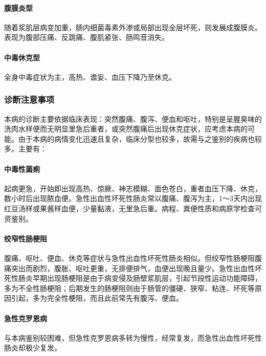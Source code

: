 \paragraph{腹膜炎型}

随着浆肌层病变加重，肠内细菌毒素外渗或局部出现全层坏死，则发展成腹膜炎。表现为腹部压痛、反跳痛、腹肌紧张、肠鸣音消失。

\paragraph{中毒休克型}

全身中毒症状为主，高热、谵妄、血压下降乃至休克。

\subsubsection{诊断注意事项}

本病的诊断主要依据临床表现：突然腹痛、腹泻、便血和呕吐，特别是呈腥臭味的洗肉水样便而无明显里急后重者，或突然腹痛后出现休克症状，应考虑本病的可能。由于本病的病情变化迅速且复杂，临床分型也较多，故需与之鉴别的疾病也较多。主要有：

\paragraph{中毒性菌痢}

起病更急，开始即出现高热、惊厥、神志模糊、面色苍白，重者血压下降、休克，数小时后出现脓血便。急性出血性坏死性肠炎常以腹痛、腹泻为主，1～3天内出现红豆汤样或果酱样血便，少量黏液，无里急后重。病程、粪便性质和病原学检查可资鉴别。

\paragraph{绞窄性肠梗阻}

腹痛、呕吐、便血、休克等症状与急性出血性坏死性肠炎相似。但绞窄性肠梗阻腹痛突出而剧烈，腹胀、呕吐更重，无排便排气，血便出现晚且量少。急性出血性坏死性肠炎早期出现肠梗阻是由于病变侵及肠壁浆肌层，引起节段性运动功能障碍，多为不全性肠梗阻；后期发生的肠梗阻则由于肠管的僵硬、狭窄、粘连、坏死等原因引起，多为完全性梗阻，而且此前常先有腹泻、便血。

\paragraph{急性克罗恩病}

与本病鉴别较困难，但急性克罗恩病多转为慢性，经常复发，而急性出血性坏死性肠炎却极少复发。

